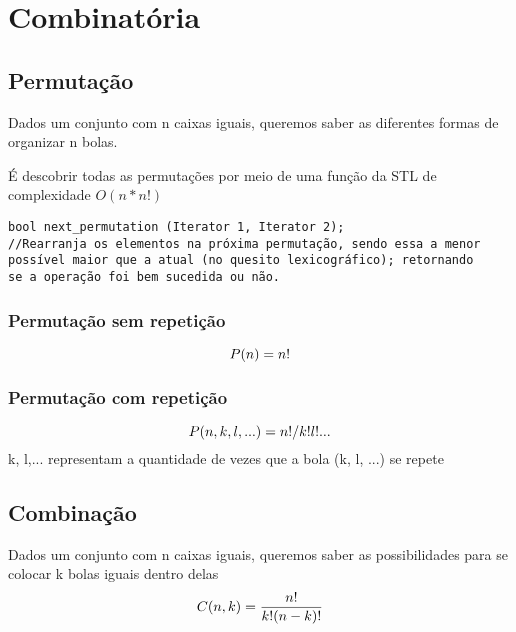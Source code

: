 \section{Combinatória}

\subsection{Permutação}
    Dados um conjunto com n caixas iguais, queremos saber as diferentes formas de organizar n bolas.
    
    É descobrir todas as permutações por meio de uma função da STL de complexidade $O(n*n!)$
\begin{verbatim}
bool next_permutation (Iterator 1, Iterator 2);
//Rearranja os elementos na próxima permutação, sendo essa a menor 
possível maior que a atual (no quesito lexicográfico); retornando 
se a operação foi bem sucedida ou não.    
\end{verbatim}
    
    \subsubsection{Permutação sem repetição}
    \begin{equation}
        \centering
        P(n) = n!
    \end{equation}

    \subsubsection{Permutação com repetição}
    \begin{equation}
        \centering
        P(n, k, l, ...) = n!/k!l!...
    \end{equation}
    k, l,... representam a quantidade de vezes que a bola (k, l, ...) se repete

\subsection{Combinação}
    Dados um conjunto com n caixas iguais, queremos saber as possibilidades para se colocar k bolas iguais dentro delas\newline
    \begin{equation}
        \centering
        C(n, k) = \frac{n!}{k!(n-k)!}
    \end{equation}
        